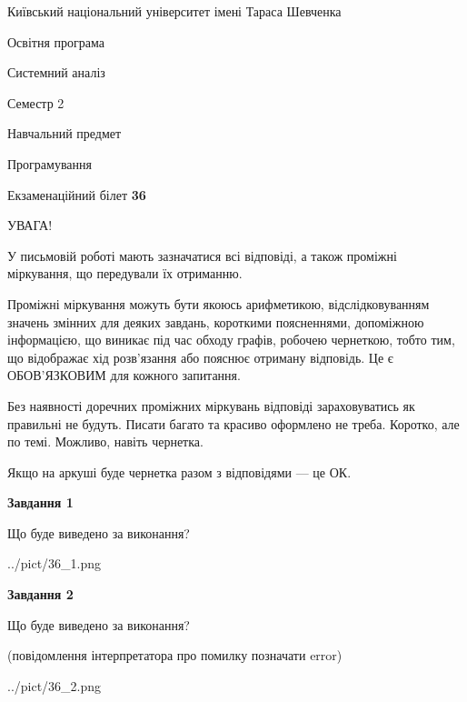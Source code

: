 \documentclass[12pt, ukrainian]{article}
\begin{document}
{{\begin {small}\par
{ \center  Київський національний університет імені Тараса Шевченка \par}
{\parbox {5 cm}{Освітня програма \hfill}{\parbox {7 cm}{Системний аналіз \hfill}}\parbox {6 cm}{\hfill Семестр 2}}\par
{\parbox {5 cm} {Навчальний предмет \hfill}\parbox {7 cm}{Програмування \hfill}\parbox {6cm}{\hfill}\par}\vspace{-7pt} \end{small}}{\center Екзаменаційний білет \No \textbf
{ 36 }\par}}
{
\begin {large}
УВАГА!

У письмовій роботі мають зазначатися всі відповіді, а також проміжні міркування, що передували їх отриманню.

Проміжні міркування можуть бути якоюсь арифметикою, відслідковуванням зна\-чень змінних для деяких завдань,
короткими поясненнями, допоміжною інформацією, що виникає під час обходу графів, робочею чернеткою,
тобто тим, що відображає хід розв’язання або пояснює отриману відповідь.
Це є ОБОВ’ЯЗКОВИМ для кожного запитання.

Без наявності доречних проміжних міркувань відповіді зараховуватись як правиль\-ні не будуть.
Писати багато та красиво оформлено не треба. Коротко, але по темі. Можли\-во, навіть чернетка.

Якщо на аркуші буде чернетка разом з відповідями --- це ОК.

\newpage

{\begin {center}\textbf{Завдання 1}\end {center}}\par
Що буде виведено за виконання?\par
\begin{center}
	{../pict/36_1.png}
\end{center}
\newpage

{\begin {center}\textbf{Завдання 2}\end {center}}\par
Що буде виведено за виконання?\par
 (повідомлення інтерпретатора про помилку позначати error)\par
\begin{center}
	{../pict/36_2.png}
\end{center}
\newpage


\end{large}}
\end{document}

